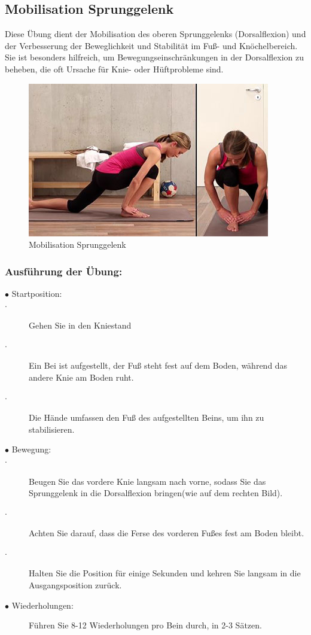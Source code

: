 
\subsection{Mobilisation Sprunggelenk}

Diese Übung dient der Mobilisation des oberen Sprunggelenks (Dorsalflexion) und der Verbesserung der Beweglichkeit und Stabilität im Fuß- und Knöchelbereich. Sie ist besonders hilfreich, um Bewegungseinschränkungen in der Dorsalflexion zu beheben, die oft Ursache für Knie- oder Hüftprobleme sind.

\begin{figure}
    \centering
    \includegraphics[width=0.5\linewidth]{img/Sprunggelenk-Mobilisation.JPG}
    \caption{Mobilisation Sprunggelenk \cite{valife}}
    \label{Mobilisation-Sprunggelenk}
\end{figure}


\subsubsection{Ausführung der Übung:}

\begin{description}
    \item[$\bullet$ Startposition:]
        \item[$\cdot$]Gehen Sie in den Kniestand
        \item[$\cdot$]Ein Bei ist aufgestellt, der Fuß steht fest auf dem Boden, während das andere Knie am Boden ruht.
        \item[$\cdot$]Die Hände umfassen den Fuß des aufgestellten Beins, um ihn zu stabilisieren.
    \item[$\bullet$ Bewegung: ]
        \item[$\cdot$]Beugen Sie das vordere Knie langsam nach vorne, sodass Sie das Sprunggelenk in die Dorsalflexion bringen(wie auf dem rechten Bild).
        \item[$\cdot$] Achten Sie darauf, dass die Ferse des vorderen Fußes fest am Boden bleibt.
        \item[$\cdot$]Halten Sie die Position für einige Sekunden und kehren Sie langsam in die Ausgangsposition zurück.
    \item[$\bullet$ Wiederholungen: ] Führen Sie 8-12 Wiederholungen pro Bein durch, in 2-3 Sätzen.

\end{description}

